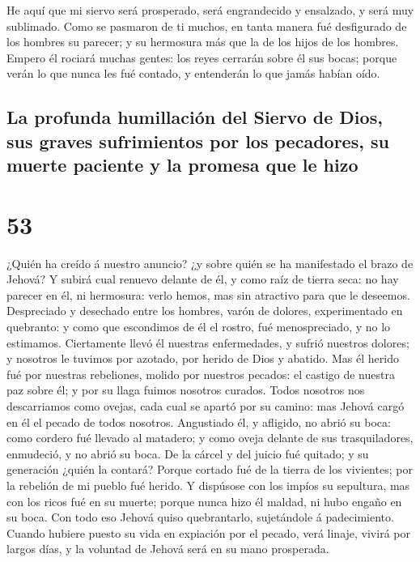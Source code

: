  He aquí que mi siervo será prosperado, será engrandecido
y ensalzado, y será muy sublimado.  Como se pasmaron de
ti muchos, en tanta manera fué desfigurado de los hombres su parecer; y
su hermosura más que la de los hijos de los hombres. 
Empero él rociará muchas gentes: los reyes cerrarán sobre él sus bocas;
porque verán lo que nunca les fué contado, y entenderán lo que jamás
habían oído.

\hypertarget{la-profunda-humillaciuxf3n-del-siervo-de-dios-sus-graves-sufrimientos-por-los-pecadores-su-muerte-paciente-y-la-promesa-que-le-hizo}{%
\subsection{La profunda humillación del Siervo de Dios, sus graves
sufrimientos por los pecadores, su muerte paciente y la promesa que le
hizo}\label{la-profunda-humillaciuxf3n-del-siervo-de-dios-sus-graves-sufrimientos-por-los-pecadores-su-muerte-paciente-y-la-promesa-que-le-hizo}}

\hypertarget{section-23-53}{%
\section{53}\label{section-23-53}}

 ¿Quién ha creído á nuestro anuncio? ¿y sobre quién se ha
manifestado el brazo de Jehová?  Y subirá cual renuevo
delante de él, y como raíz de tierra seca: no hay parecer en él, ni
hermosura: verlo hemos, mas sin atractivo para que le deseemos.
 Despreciado y desechado entre los hombres, varón de
dolores, experimentado en quebranto: y como que escondimos de él el
rostro, fué menospreciado, y no lo estimamos.  Ciertamente
llevó él nuestras enfermedades, y sufrió nuestros dolores; y nosotros le
tuvimos por azotado, por herido de Dios y abatido.  Mas él
herido fué por nuestras rebeliones, molido por nuestros pecados: el
castigo de nuestra paz sobre él; y por su llaga fuimos nosotros curados.
 Todos nosotros nos descarriamos como ovejas, cada cual se
apartó por su camino: mas Jehová cargó en él el pecado de todos
nosotros.  Angustiado él, y afligido, no abrió su boca:
como cordero fué llevado al matadero; y como oveja delante de sus
trasquiladores, enmudeció, y no abrió su boca.  De la
cárcel y del juicio fué quitado; y su generación ¿quién la contará?
Porque cortado fué de la tierra de los vivientes; por la rebelión de mi
pueblo fué herido.  Y dispúsose con los impíos su
sepultura, mas con los ricos fué en su muerte; porque nunca hizo él
maldad, ni hubo engaño en su boca.  Con todo eso Jehová
quiso quebrantarlo, sujetándole á padecimiento. Cuando hubiere puesto su
vida en expiación por el pecado, verá linaje, vivirá por largos días, y
la voluntad de Jehová será en su mano prosperada.

